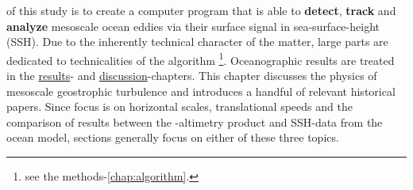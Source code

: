   of this study is to create a computer program that is able to \textbf{detect}, \textbf{track} and \textbf{analyze} mesoscale ocean eddies via their surface signal in sea-surface-height (SSH). Due to the inherently technical character of the matter, large parts are dedicated to technicalities of the algorithm \footnote{see the methods-\cref{chap:algorithm}.}. Oceanographic results are treated in the \href{chap:results}{results}- and \href{chap:discussion}{discussion}-chapters. This chapter discusses the physics of mesoscale geostrophic turbulence and introduces a handful of relevant historical papers. Since focus is on horizontal scales, translational speeds and the comparison of results between the \AVI-altimetry product and SSH-data from the \POP ocean model, sections generally focus on either of these three topics.
